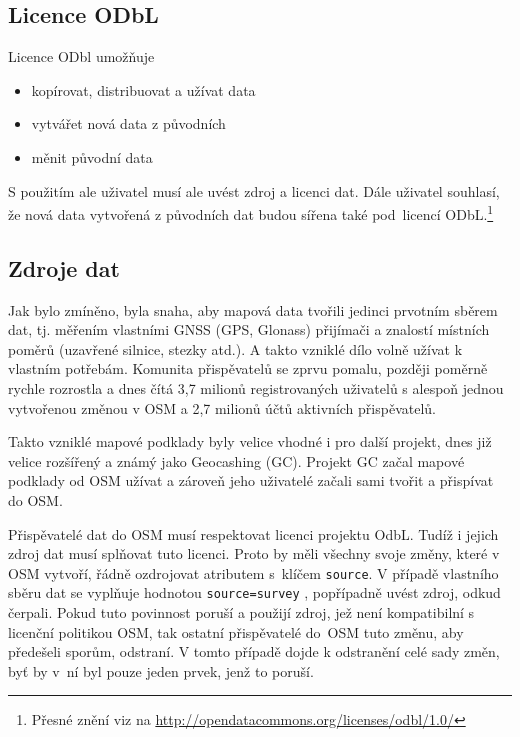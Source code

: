 \subsection{Licence ODbL}

Licence ODbl umožňuje
\begin{itemize}
    \item    kopírovat, distribuovat a užívat data
    \item    vytvářet nová data z původních
    \item    měnit původní data
\end{itemize}

S použitím ale uživatel musí ale uvést zdroj a licenci dat.
Dále uživatel souhlasí, že nová data vytvořená z původních dat budou sířena
také pod~licencí ODbL.\footnote{Přesné znění viz na \url{http://opendatacommons.org/licenses/odbl/1.0/}}


\subsection{Zdroje dat}
\label{Zdroje dat}
Jak bylo zmíněno, byla snaha, aby mapová data tvořili jedinci prvotním
sběrem dat, tj. měřením vlastními GNSS (GPS, Glonass) přijímači a
znalostí místních poměrů (uzavřené silnice, stezky atd.).  A takto
vzniklé dílo volně užívat k vlastním potřebám.  Komunita přispěvatelů se
zprvu pomalu, později poměrně rychle rozrostla a dnes čítá 3,7 milionů
registrovaných uživatelů s alespoň jednou vytvořenou změnou v OSM a
2,7 milionů účtů aktivních přispěvatelů.\cite{OSMstats}

Takto vzniklé mapové podklady byly velice vhodné i pro další projekt, dnes již
velice rozšířený a známý jako Geocashing (GC). Projekt GC začal mapové
podklady od OSM užívat a zároveň jeho uživatelé začali sami tvořit a
přispívat do OSM. 

Přispěvatelé dat do OSM musí respektovat licenci projektu OdbL.
Tudíž i jejich zdroj dat musí splňovat tuto licenci. Proto by měli
všechny svoje změny, které v OSM vytvoří, řádně ozdrojovat atributem
s~klíčem 
{\tt source}.
V případě vlastního sběru dat se vyplňuje hodnotou
{\tt source=survey} ,
popřípadně uvést zdroj, odkud čerpali. Pokud tuto povinnost poruší a
použijí zdroj, jež není kompatibilní s licenční politikou OSM, tak ostatní 
přispěvatelé do~OSM tuto změnu, aby předešeli sporům, odstraní. 
V tomto případě dojde k odstranění celé sady změn, byť by v~ní byl pouze jeden prvek, jenž to poruší.

